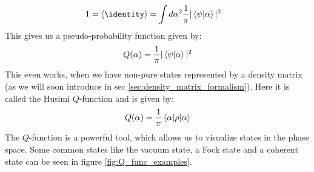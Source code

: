 \begin{align*}
    1 = \expval{\identity} &= \int d\alpha^2 \frac{1}{\pi} |\braket{\psi}{\alpha}|^2
\end{align*}
This gives us a pseudo-probability function given by: 
\begin{equation}
    Q(\alpha) = \frac{1}{\pi} |\braket{\psi}{\alpha}|^2
\end{equation}
This even works, when we have non-pure states represented by a density matrix (as we will soon introduce in sec \ref{sec:density_matrix_formalism}). Here it is called the Husimi $Q$-function and is given by:
\begin{equation}
    Q(\alpha) =  \frac{1}{\pi} \mel{\alpha}{\rho}{\alpha}
\end{equation}
The $Q$-function is a powerful tool, which allows us to visualize states in the phase space. Some common states like the vacuum state, a Fock state and a coherent state can be seen in figure \ref{fig:Q_func_examples}.

